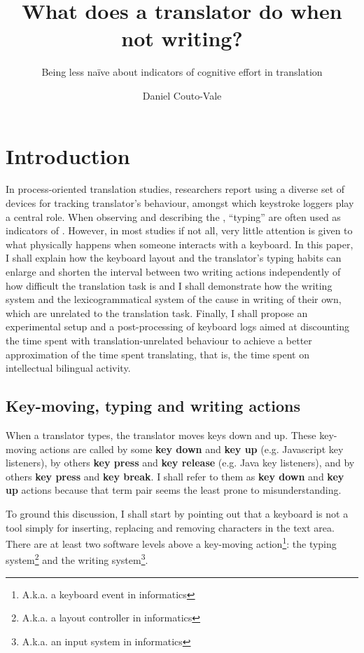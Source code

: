 \documentclass[output=paper]{LSP/langsci}
\title{What does a translator do when not writing?}
\subtitle{Being less naïve about indicators of cognitive effort in translation}
\author{Daniel Couto-Vale}
\affiliation{RWTH-Aachen University}
\begin{document}
\maketitle


\section{Introduction}
\label{couto:sec:intro}

In process-oriented translation studies, researchers report using a diverse set of devices for tracking translator's behaviour, amongst which keystroke loggers play a central role. When observing and describing the , ``typing''  are often used as indicators of  \citep{Hansen:1999wn,Hansen:2002wu,Alves:2003va,PACTE:2005vu,Dragsted:2004tj,Dragsted:2005vl}. However, in most studies if not all, very little attention is given to what physically happens when someone interacts with a keyboard. In this paper, I shall explain how the keyboard layout and the translator's typing habits can enlarge and shorten the interval between two writing actions independently of how difficult the translation task is and I shall demonstrate how the writing system and the lexicogrammatical system of the  cause  in writing of their own, which are unrelated to the translation task. Finally, I shall propose an experimental setup and a post-processing of keyboard logs aimed at discounting the time spent with translation-unrelated behaviour to achieve a better approximation of the time spent translating, that is, the time spent on intellectual bilingual activity.

\subsection{Key-moving, typing and writing actions}
\label{couto:sec:KeyMovingTypingWriting}

When a translator types, the translator moves keys down and up. These key-moving actions are called by some \textbf{key down} and \textbf{key up} (e.g. Javascript key listeners), by others \textbf{key press} and \textbf{key release} (e.g. Java key listeners), and by others \textbf{key press} and \textbf{key break}. I shall refer to them as \textbf{key down} and \textbf{key up} actions because that term pair seems the least prone to misunderstanding.

To ground this discussion, I shall start by pointing out that a keyboard is not a tool simply for inserting, replacing and removing characters in the text area. There are at least two software levels above a key-moving action\footnote{A.k.a. a keyboard event in informatics}: the typing system\footnote{A.k.a. a layout controller in informatics} and the writing system\footnote{A.k.a. an input system in informatics}.
\end{document}
